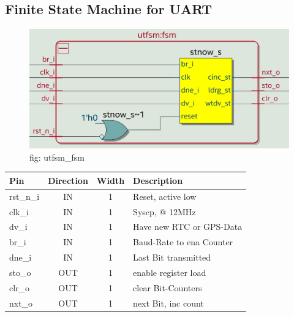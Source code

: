 \documentclass[12pt,a4 paper] {report}
\begin{document}
\newpage

\subsection{Finite State Machine for UART}
\begin{figure}[h]
	\centering	
	\includegraphics[scale=0.2]{../png/utfsm_fsm.png}
	\newline
	fig: utfsm\_fsm\\
\end{figure}

\begin{center}
	\begin{tabular}{ | p{2cm} | c | c | p{5cm} |}
		\hline
		\textbf{Pin} & \textbf{Direction} & \textbf{Width} & \textbf{Description} \\
		\hline	
		rst\_n\_i & IN & 1 & Reset, active low \\
		\hline
		clk\_i & IN & 1 & Syscp, @ 12MHz \\
		\hline
		dv\_i  & IN & 1 & Have new RTC or GPS-Data \\
		\hline
		br\_i  & IN & 1 & Baud-Rate to ena Counter \\
		\hline
		dne\_i & IN & 1 & Last Bit transmitted \\
		\hline
		sto\_o & OUT & 1 & enable register load \\
		\hline
		clr\_o & OUT & 1 & clear Bit-Counters \\
		\hline
		nxt\_o & OUT & 1 & next Bit, inc count \\
		\hline
		
	\end{tabular}
\end{center}

\newpage
\end{document}
